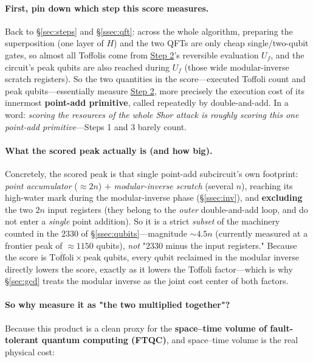 \documentclass[11pt]{article}
\newcommand{\secref}[1]{\hyperref[#1]{\S\ref*{#1}}}
\begin{document}
\paragraph{First, pin down which step this score measures.}
Back to \secref{sec:steps} and \secref{ssec:qft}: across the whole algorithm, preparing the superposition (one layer of $H$) and the two QFTs are only cheap single/two-qubit
gates, so almost all Toffolis come from \hyperref[step:eval]{Step 2}'s reversible evaluation $U_f$, and the circuit's peak qubits are also reached during $U_f$ (those wide
modular-inverse scratch registers). So the two quantities in the score---executed Toffoli count and peak qubits---essentially measure \hyperref[step:eval]{Step 2},
more precisely the execution cost of its innermost \textbf{point-add primitive}, called repeatedly by double-and-add. In a word: \emph{scoring the resources of the whole Shor
attack is roughly scoring this one point-add primitive}---Steps 1 and 3 barely count.

\paragraph{What the scored peak actually is (and how big).}
Concretely, the scored peak is that single point-add subcircuit's own footprint: \emph{point accumulator} ($\approx2n$) $+$ \emph{modular-inverse scratch} (several $n$), reaching its high-water mark
during the modular-inverse phase (\secref{ssec:inv}), and \textbf{excluding} the two $2n$ input registers (they belong to the \emph{outer} double-and-add loop, and do not enter a \emph{single} point
addition). So it is a strict \emph{subset} of the machinery counted in the $2330$ of \secref{ssec:qubits}---magnitude $\sim 4.5n$ (currently measured at a frontier peak of $\approx 1150$
qubits), \emph{not} "$2330$ minus the input registers." Because the score is $\overline{\text{Toffoli}}\times$peak qubits, every qubit reclaimed in the modular inverse directly lowers
the score, exactly as it lowers the Toffoli factor---which is why \secref{sec:gcd} treats the modular inverse as the joint cost center of both factors.

\paragraph{So why measure it as "the two multiplied together"?}
Because this product is a clean proxy for the \textbf{space--time volume of fault-tolerant quantum computing (FTQC)}, and space--time volume is the real
physical cost:
\end{document}
